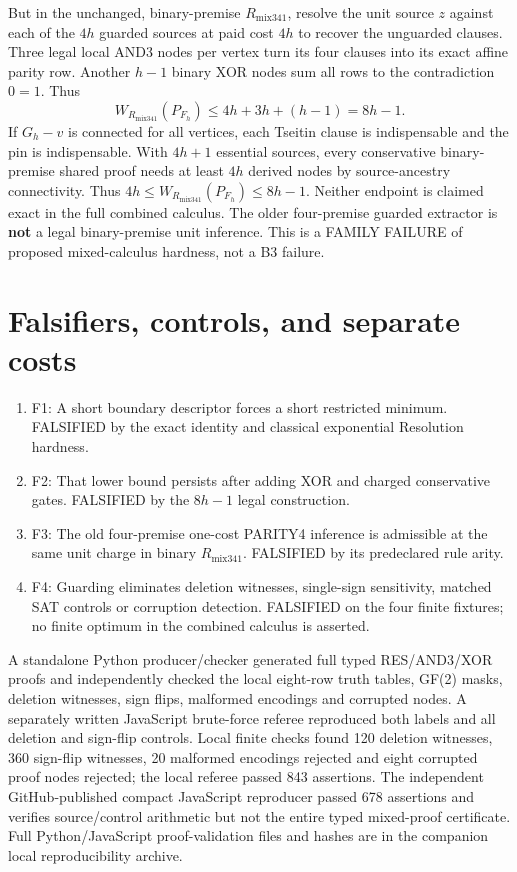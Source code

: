 \documentclass[11pt]{article}
\begin{document}
But in the unchanged, binary-premise $R_{\mathrm{mix341}}$, resolve the unit source $z$ against each of the $4h$ guarded sources at paid cost $4h$ to recover the unguarded clauses. Three legal local AND3 nodes per vertex turn its four clauses into its exact affine parity row. Another $h-1$ binary XOR nodes sum all rows to the contradiction $0=1$. Thus
\[
 \boxed{W_{R_{\mathrm{mix341}}}(P_{F_h})\le4h+3h+(h-1)=8h-1.}
\]
If $G_h-v$ is connected for all vertices, each Tseitin clause is indispensable and the pin is indispensable. With $4h+1$ essential sources, every conservative binary-premise shared proof needs at least $4h$ derived nodes by source-ancestry connectivity. Thus $4h\le W_{R_{\mathrm{mix341}}}(P_{F_h})\le8h-1$. Neither endpoint is claimed exact in the full combined calculus. The older four-premise guarded extractor is \textbf{not} a legal binary-premise unit inference. This is a FAMILY FAILURE of proposed mixed-calculus hardness, not a B3 failure.

\section*{Falsifiers, controls, and separate costs}
\begin{enumerate}
\item[] F1: A short boundary descriptor forces a short restricted minimum. FALSIFIED by the exact identity and classical exponential Resolution hardness.
\item[] F2: That lower bound persists after adding XOR and charged conservative gates. FALSIFIED by the $8h-1$ legal construction.
\item[] F3: The old four-premise one-cost PARITY4 inference is admissible at the same unit charge in binary $R_{\mathrm{mix341}}$. FALSIFIED by its predeclared rule arity.
\item[] F4: Guarding eliminates deletion witnesses, single-sign sensitivity, matched SAT controls or corruption detection. FALSIFIED on the four finite fixtures; no finite optimum in the combined calculus is asserted.
\end{enumerate}
A standalone Python producer/checker generated full typed RES/AND3/XOR proofs and independently checked the local eight-row truth tables, GF(2) masks, deletion witnesses, sign flips, malformed encodings and corrupted nodes. A separately written JavaScript brute-force referee reproduced both labels and all deletion and sign-flip controls. Local finite checks found 120 deletion witnesses, 360 sign-flip witnesses, 20 malformed encodings rejected and eight corrupted proof nodes rejected; the local referee passed 843 assertions. The independent GitHub-published compact JavaScript reproducer passed 678 assertions and verifies source/control arithmetic but not the entire typed mixed-proof certificate. Full Python/JavaScript proof-validation files and hashes are in the companion local reproducibility archive.
\end{document}
